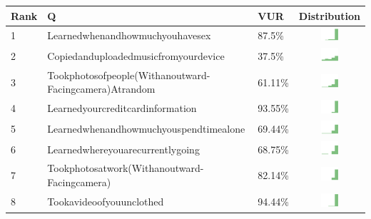 \begin{table}[t]
\begin{center}
\small
\begin{tabular}{| p{0.5cm} | p{7cm} | p{1cm} | c |}
\hline
 Rank & Q &  VUR & Distribution  \\ 
\hline
1 & Learnedwhenandhowmuchyouhavesex & 87.5\% & \includegraphics[width = 2cm, height = 0.5cm]{../learnedwhenandhowmuchyouhavesexPUBLIC} \\ \hline 
2 & Copiedanduploadedmusicfromyourdevice & 37.5\% & \includegraphics[width = 2cm, height = 0.5cm]{../copiedanduploadedmusicfromyourdevicePUBLIC} \\ \hline 
3 & Tookphotosofpeople(Withanoutward-Facingcamera)Atrandom & 61.11\% & \includegraphics[width = 2cm, height = 0.5cm]{../tookphotosofpeople(withanoutward-facingcamera)atrandomPUBLIC} \\ \hline 
4 & Learnedyourcreditcardinformation & 93.55\% & \includegraphics[width = 2cm, height = 0.5cm]{../learnedyourcreditcardinformationPUBLIC} \\ \hline 
5 & Learnedwhenandhowmuchyouspendtimealone & 69.44\% & \includegraphics[width = 2cm, height = 0.5cm]{../learnedwhenandhowmuchyouspendtimealonePUBLIC} \\ \hline 
6 & Learnedwhereyouarecurrentlygoing & 68.75\% & \includegraphics[width = 2cm, height = 0.5cm]{../learnedwhereyouarecurrentlygoingPUBLIC} \\ \hline 
7 & Tookphotosatwork(Withanoutward-Facingcamera) & 82.14\% & \includegraphics[width = 2cm, height = 0.5cm]{../tookphotosatwork(withanoutward-facingcamera)PUBLIC} \\ \hline 
8 & Tookavideoofyouunclothed & 94.44\% & \includegraphics[width = 2cm, height = 0.5cm]{../tookavideoofyouunclothedPUBLIC} \\ \hline 

\end{tabular}
\end{center}
\end{table}
